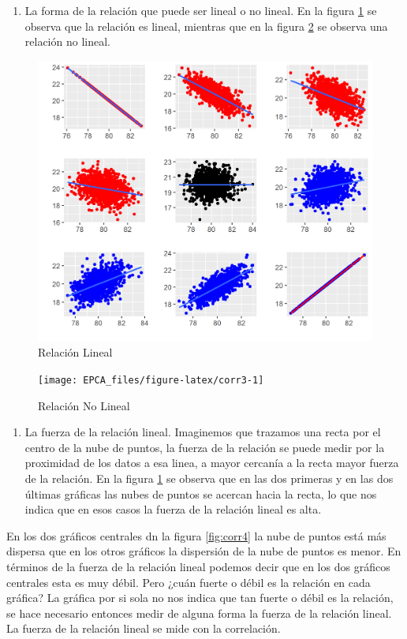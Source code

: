 \documentclass[letterpaper,]{book}
\providecommand{\tightlist}{%
  \setlength{\itemsep}{0pt}\setlength{\parskip}{0pt}}
\begin{document}
\begin{enumerate}
\def\labelenumi{\arabic{enumi}.}
\setcounter{enumi}{1}
\tightlist
\item
  La forma de la relación que puede ser lineal o no lineal. En la figura \ref{fig:corr2} se observa que la relación es lineal, mientras que en la figura \ref{fig:corr3} se observa una relación no lineal.
\end{enumerate}

\begin{figure}[!h]

{\centering \includegraphics[width=0.5\linewidth]{corr2} 

}

\caption{Relación Lineal}\label{fig:corr2}
\end{figure}

\begin{figure}[!h]

{\centering \texttt{[image: EPCA\_files/figure-latex/corr3-1]} 

}

\caption{Relación No Lineal}\label{fig:corr3}
\end{figure}

\begin{enumerate}
\def\labelenumi{\arabic{enumi}.}
\setcounter{enumi}{2}
\tightlist
\item
  La fuerza de la relación lineal. Imaginemos que trazamos una recta por el centro de la nube de puntos, la fuerza de la relación se puede medir por la proximidad de los datos a esa linea, a mayor cercanía a la recta mayor fuerza de la relación. En la figura \ref{fig:corr2} se observa que en las dos primeras y en las dos últimas gráficas las nubes de puntos se acercan hacia la recta, lo que nos indica que en esos casos la fuerza de la relación lineal es alta.
\end{enumerate}

En los dos gráficos centrales dn la figura \ref{fig:corr4} la nube de puntos está más dispersa que en los otros gráficos la dispersión de la nube de puntos es menor. En términos de la fuerza de la relación lineal podemos decir que en los dos gráficos centrales esta es muy débil. Pero ¿cuán fuerte o débil es la relación en cada gráfica? La gráfica por si sola no nos indica que tan fuerte o débil es la relación, se hace necesario entonces medir de alguna forma la fuerza de la relación lineal. La fuerza de la relación lineal se mide con la correlación.
\end{document}
